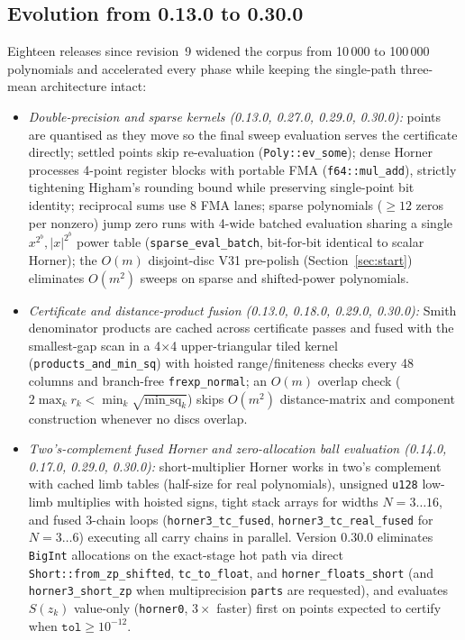 \documentclass[10pt,a4paper]{article}
\theoremstyle{definition}
\numberwithin{equation}{section}
\begin{document}
\subsection{Evolution from 0.13.0 to 0.30.0}
Eighteen releases since revision~9 widened the corpus from 10\,000 to 100\,000 polynomials and accelerated every phase while keeping the single-path three-mean architecture intact:
\begin{itemize}
\item \emph{Double-precision and sparse kernels (0.13.0, 0.27.0, 0.29.0, 0.30.0):} points are quantised as they move so the final sweep evaluation serves the certificate directly; settled points skip re-evaluation (\texttt{Poly::ev\_some}); dense Horner processes 4-point register blocks with portable FMA (\texttt{f64::mul\_add}), strictly tightening Higham's rounding bound while preserving single-point bit identity; reciprocal sums use 8 FMA lanes; sparse polynomials ($\ge 12$ zeros per nonzero) jump zero runs with 4-wide batched evaluation sharing a single $x^{2^b}, |x|^{2^b}$ power table (\texttt{sparse\_eval\_batch}, bit-for-bit identical to scalar Horner); the $O(m)$ disjoint-disc V31 pre-polish (Section~\ref{sec:start}) eliminates $O(m^2)$ sweeps on sparse and shifted-power polynomials.
\item \emph{Certificate and distance-product fusion (0.13.0, 0.18.0, 0.29.0, 0.30.0):} Smith denominator products are cached across certificate passes and fused with the smallest-gap scan in a 4$\times$4 upper-triangular tiled kernel (\texttt{products\_and\_min\_sq}) with hoisted range/finiteness checks every 48 columns and branch-free \texttt{frexp\_normal}; an $O(m)$ overlap check ($2\max_k r_k < \min_k\sqrt{\mathrm{min\_sq}_k}$) skips $O(m^2)$ distance-matrix and component construction whenever no discs overlap.
\item \emph{Two's-complement fused Horner and zero-allocation ball evaluation (0.14.0, 0.17.0, 0.29.0, 0.30.0):} short-multiplier Horner works in two's complement with cached limb tables (half-size for real polynomials), unsigned \texttt{u128} low-limb multiplies with hoisted signs, tight stack arrays for widths $N=3\dots16$, and fused 3-chain loops (\texttt{horner3\_tc\_fused}, \texttt{horner3\_tc\_real\_fused} for $N=3\dots6$) executing all carry chains in parallel. Version 0.30.0 eliminates \texttt{BigInt} allocations on the exact-stage hot path via direct \texttt{Short::from\_zp\_shifted}, \texttt{tc\_to\_float}, and \texttt{horner\_floats\_short} (and \texttt{horner3\_short\_zp} when multiprecision \texttt{parts} are requested), and evaluates $S(z_k)$ value-only (\texttt{horner0}, $3\times$ faster) first on points expected to certify when $\texttt{tol}\ge10^{-12}$.

\end{itemize}
\end{document}

